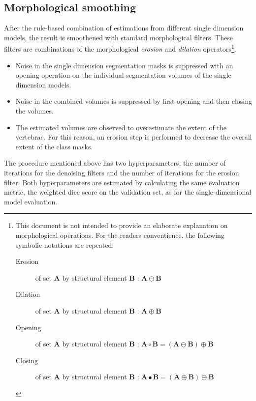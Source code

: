 \subsection{Morphological smoothing}
After the rule-based combination of estimations from different single dimension models, the result is smoothened with standard morphological filters.
These filters are combinations of the morphological \textit{erosion} and \textit{dilation} operators\footnote{
    This document is not intended to provide an elaborate explanation on morphological operations.
    For the readers conventience, the following symbolic notations are repeated:
    \begin{description}
        \item[Erosion] of set $\mathbf{A}$ by structural element $\mathbf{B}$ : $\mathbf{A} \ominus \mathbf{B}$ 
        \item[Dilation] of set $\mathbf{A}$ by structural element $\mathbf{B}$ : $\mathbf{A} \oplus \mathbf{B}$ 
        \item[Opening] of set $\mathbf{A}$ by structural element $\mathbf{B}$ : $\mathbf{A} \circ \mathbf{B} = (\mathbf{A} \ominus \mathbf{B}) \oplus \mathbf{B}$
        \item[Closing] of set $\mathbf{A}$ by structural element $\mathbf{B}$ : $\mathbf{A} \bullet \mathbf{B} = (\mathbf{A} \oplus \mathbf{B}) \ominus \mathbf{B}$
    \end{description}
}.

\begin{itemize}
    \item Noise in the single dimension segmentation masks is suppressed with an opening operation on the individual segmentation volumes of the single dimension models.
    \item Noise in the combined volumes is suppressed by first opening and then closing the volumes.
    \item The estimated volumes are observed to overestimate the extent of the vertebrae. For this reason, an erosion step is performed to decrease the overall extent of the class masks.
\end{itemize}

The procedure mentioned above has two hyperparameters: the number of iterations for the denoising filters and the number of iterations for the erosion filter.
Both hyperparameters are estimated by calculating the same evaluation metric, the weighted dice score on the validation set, as for the single-dimensional model evaluation. 

